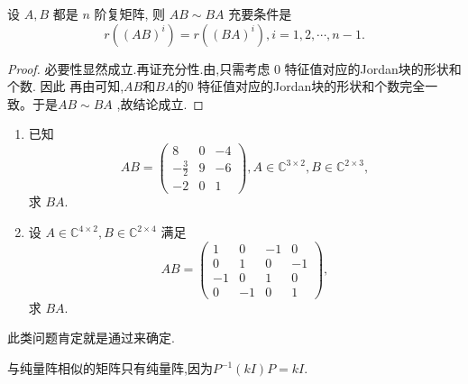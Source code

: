 \documentclass[../../main.tex]{subfiles}
\begin{document}
\begin{corollary}
设 \( A,B \) 都是 \( n \) 阶复矩阵, 则 \( AB \sim BA \) 充要条件是
\[
r\left( (AB)^i \right) = r\left( (BA)^i \right), i = 1,2,\cdots, n - 1.
\]
\end{corollary}
\begin{proof}
必要性显然成立.再证充分性.由,只需考虑 0 特征值对应的Jordan块的形状和个数. 因此 再由可知,$AB$和$BA$的0 特征值对应的Jordan块的形状和个数完全一致。于是\( AB \sim BA \) ,故结论成立.

\end{proof}

\begin{example}
\begin{enumerate}
\item 已知
\[
AB = \begin{pmatrix}
8 & 0 & -4 \\
-\frac{3}{2} & 9 & -6 \\
-2 & 0 & 1
\end{pmatrix}, A \in \mathbb{C}^{3 \times 2}, B \in \mathbb{C}^{2 \times 3},
\]
求 \( BA \).

\item 设 \( A \in \mathbb{C}^{4 \times 2}, B \in \mathbb{C}^{2 \times 4} \) 满足
\[
AB = \begin{pmatrix}
1 & 0 & -1 & 0 \\
0 & 1 & 0 & -1 \\
-1 & 0 & 1 & 0 \\
0 & -1 & 0 & 1
\end{pmatrix},
\]
求 \( BA \).
\end{enumerate}
\end{example}
\begin{note}
此类问题肯定就是通过来确定.
\end{note}
\begin{remark}
与纯量阵相似的矩阵只有纯量阵,因为$P^{-1}(kI)P=kI$.
\end{remark}
\end{document}
